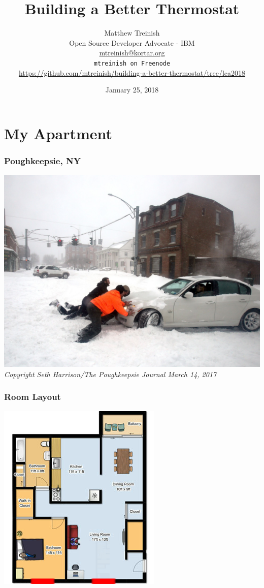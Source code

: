 \documentclass[aspectratio=169,11pt,hyperref={colorlinks=true}]{beamer}
\author[Matthew Treinish]{%
    \texorpdfstring{%
        \centering
        Matthew Treinish\\
        Open Source Developer Advocate - IBM \\
        \href{mailto:mtreinish@kortar.org}{mtreinish@kortar.org}\\
        \texttt{mtreinish on Freenode}\\
        \href{https://github.com/mtreinish/building-a-better-thermostat/tree/lca2018}{https://github.com/mtreinish/building-a-better-thermostat/tree/lca2018}
   }
   {Matthew Treinish}
}
\date{January 25, 2018}
\title{Building a Better Thermostat}
\begin{document}
\titlepage

\section{My Apartment}
\begin{frame}
    \frametitle{Poughkeepsie, NY}
    \begin{center}
        \includegraphics[height=.85\textheight]{snow.jpg}\\
        \footnotesize
        \textit{Copyright Seth Harrison/The Poughkeepsie Journal March 14, 2017}
    \end{center}
\end{frame}

\begin{frame}
    \frametitle{Room Layout}
    \begin{center}
    \includegraphics[height=.85\textheight]{floorplan.png}
    \end{center}
\end{frame}
\end{document}

